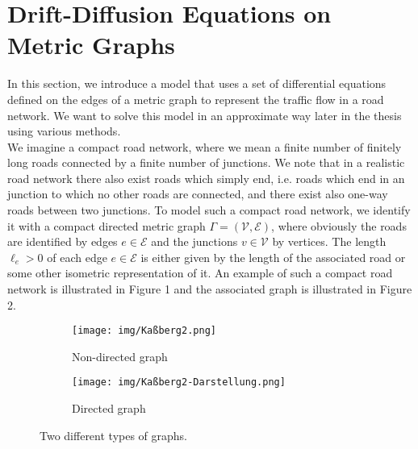 \section{Drift-Diffusion Equations on Metric Graphs}
\label{ch1:sec2}

In this section, we introduce a model that uses a set of differential equations defined on the edges of a metric graph to represent the traffic flow in a road network. We want to solve this model in an approximate way later in the thesis using various methods. \\
We imagine a compact road network, where we mean a finite number of finitely long roads connected by a finite number of junctions. We note that in a realistic road network there also exist roads which simply end, i.e. roads which end in an junction to which no other roads are connected, and there exist also one-way roads between two junctions. To model such a compact road network, we identify it with a compact directed metric graph $\Gamma = (\mathcal{V}, \mathcal{E})$, where obviously the roads are identified by edges $e \in \mathcal{E}$ and the junctions $v \in \mathcal{V}$ by vertices. The length $\ell_e > 0$ of each edge $e \in \mathcal{E}$ is either given by the length of the associated road or some other isometric representation of it. An example of such a compact road network is illustrated in Figure 1 and the associated graph is illustrated in Figure 2. \\

\begin{figure}[H]
    \begin{subfigure}[b]{0.4\textwidth}
        \begin{center}
            \texttt{[image: img/Kaßberg2.png]}
        \end{center}
        \caption{Non-directed graph}
        \label{fig8:f1}
    \end{subfigure}
    \begin{subfigure}[b]{0.4\textwidth}
        \begin{center}
            \texttt{[image: img/Kaßberg2-Darstellung.png]}
        \end{center}
        \caption{Directed graph}
        \label{fig8:f2}
    \end{subfigure}
    \caption{Two different types of graphs.}
\end{figure}

